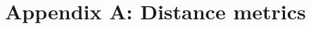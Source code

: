 \documentclass[a4paper,11pt,oneside]{article}
\begin{document}




\pagebreak
\clearpage


\pagebreak
\clearpage




\pagebreak
\clearpage

\appendix
\section{Appendix A: Distance metrics}
\end{document}

